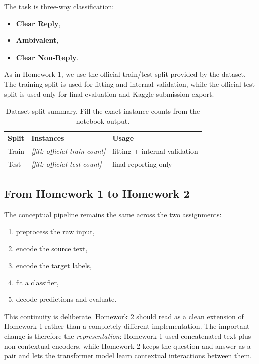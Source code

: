 \documentclass[12pt]{fphw}
\newcommand{\placeholder}[1]{\textit{[fill: #1]}}
\begin{document}
The task is three-way classification:
\begin{itemize}
	\item \textbf{Clear Reply},
	\item \textbf{Ambivalent},
	\item \textbf{Clear Non-Reply}.
\end{itemize}

As in Homework 1, we use the official train/test split provided by the dataset. The training split is used for fitting and internal validation, while the official test split is used only for final evaluation and Kaggle submission export.

\begin{table}[h]
\centering
\begin{tabular}{lll}
\toprule
Split & Instances & Usage \\
\midrule
Train & \placeholder{official train count} & fitting + internal validation \\
Test & \placeholder{official test count} & final reporting only \\
\bottomrule
\end{tabular}
\caption{Dataset split summary. Fill the exact instance counts from the notebook output.}
\label{tab:dataset-sizes}
\end{table}

\subsection{From Homework 1 to Homework 2}

The conceptual pipeline remains the same across the two assignments:
\begin{enumerate}
	\item preprocess the raw input,
	\item encode the source text,
	\item encode the target labels,
	\item fit a classifier,
	\item decode predictions and evaluate.
\end{enumerate}

This continuity is deliberate. Homework 2 should read as a clean extension of Homework 1 rather than a completely different implementation. The important change is therefore the \emph{representation}: Homework 1 used concatenated text plus non-contextual encoders, while Homework 2 keeps the question and answer as a pair and lets the transformer model learn contextual interactions between them.
\end{document}
